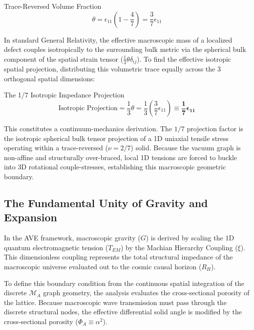 \begin{resultbox}{Trace-Reversed Volume Fraction}
\begin{equation}
\theta=\epsilon_{11}\left(1-\frac{4}{7}\right)=\frac{3}{7}\epsilon_{11}
\end{equation}
\end{resultbox}

In standard General Relativity, the effective macroscopic mass of a localized defect couples isotropically to the surrounding bulk metric via the spherical bulk component of the spatial strain tensor ($\frac{1}{3}\theta\delta_{ij}$). To find the effective isotropic spatial projection, distributing this volumetric trace equally across the 3 orthogonal spatial dimensions:

\begin{resultbox}{The 1/7 Isotropic Impedance Projection}
\begin{equation}
\text{Isotropic Projection} = \frac{1}{3}\theta = \frac{1}{3}\left(\frac{3}{7}\epsilon_{11}\right) \equiv \mathbf{\frac{1}{7}\epsilon_{11}}
\end{equation}
\end{resultbox}

This constitutes a continuum-mechanics derivation. The $1/7$ projection factor is the isotropic spherical bulk tensor projection of a 1D uniaxial tensile stress operating within a trace-reversed ($\nu=2/7$) solid. Because the vacuum graph is non-affine and structurally over-braced, local 1D tensions are forced to buckle into 3D rotational couple-stresses, establishing this macroscopic geometric boundary.

\subsection{The Fundamental Unity of Gravity and Expansion}

In the AVE framework, macroscopic gravity ($G$) is derived by scaling the 1D quantum electromagnetic tension ($T_{EM}$) by the Machian Hierarchy Coupling ($\xi$). This dimensionless coupling represents the total structural impedance of the macroscopic universe evaluated out to the cosmic causal horizon ($R_{H}$).

To define this boundary condition from the continuous spatial integration of the discrete $\mathcal{M}_{A}$ graph geometry, the analysis evaluates the cross-sectional porosity of the lattice. Because macroscopic wave transmission must pass through the discrete structural nodes, the effective differential solid angle is modified by the cross-sectional porosity ($\Phi_{A}\equiv\alpha^{2}$).

